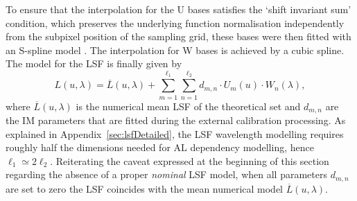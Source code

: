 \documentclass{aa}
\newcommand{\appref}[1]{Appendix~\ref{sec:#1}}
\begin{document}
To ensure that the interpolation for the U bases satisfies the `shift invariant sum' condition, which preserves the underlying function normalisation independently from the subpixel position of the sampling grid,  these bases were then fitted with an S-spline model \citep{LL:LL-084}. The interpolation for W bases is achieved by a cubic spline.
The model for the LSF is finally  given by
\begin{equation}
\label{eq:fullLsf}
L(u, \lambda) = \overline{L}(u, \lambda) + \sum_{m=1}^{\ell_1}  \sum_{n=1}^{\ell_2} d_{m,n} \cdot U_{m}(u) \cdot W_{n}(\lambda)
,\end{equation}
where $\overline{L}(u, \lambda)$ is the numerical mean LSF of the theoretical set and $d_{m,n}$ are the IM parameters that are fitted during the external calibration processing. As explained in \appref{lsfDetailed}, the LSF wavelength modelling requires roughly half the dimensions needed for AL dependency modelling, hence $\ell_1\simeq 2\ell_2$. Reiterating the caveat expressed at the beginning of this section regarding the absence of a proper \emph{nominal} LSF model, when all parameters $d_{m,n}$ are set to zero the LSF coincides with the mean numerical model  $\overline{L}(u, \lambda)$.

\end{document}
